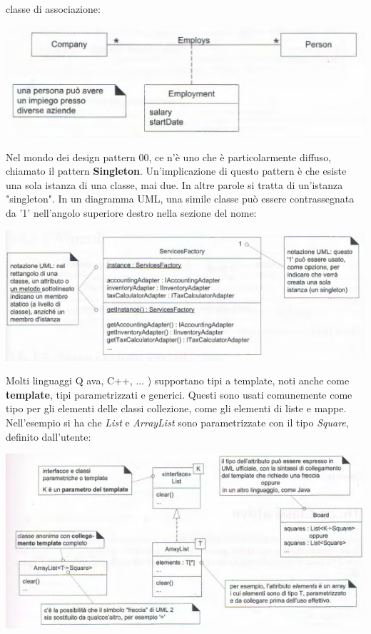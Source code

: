 \documentclass[a4paper,12pt, oneside]{book}
\begin{document}
classe di associazione:
\begin{center}
	\includegraphics[scale=0.7]{img/clasd18.png}
\end{center}
Nel mondo dei design pattern 00, ce n'è uno che è particolarmente diffuso, chiamato il pattern \textbf{Singleton}. Un'implicazione di questo pattern è
che esiste una sola istanza di una classe, mai due. In altre parole si tratta di un'istanza "singleton". In un diagramma UML, una simile classe può essere contrassegnata da '1'
nell'angolo superiore destro nella sezione del nome:
\begin{center}
	\includegraphics[scale=0.7]{img/clasd19.png}
\end{center}
Molti linguaggi Q ava, C++, ... ) supportano tipi a template, noti anche come \textbf{template}, tipi parametrizzati e generici. Questi sono usati comunemente come tipo per gli elementi delle classi collezione, come gli elementi di liste e mappe. Nell'esempio si ha che \textit{List} e \textit{ArrayList} sono parametrizzate con il tipo \textit{Square}, definito dall'utente:
\begin{center}
	\includegraphics[scale=0.7]{img/clasd20.png}
\end{center}
\end{document}
